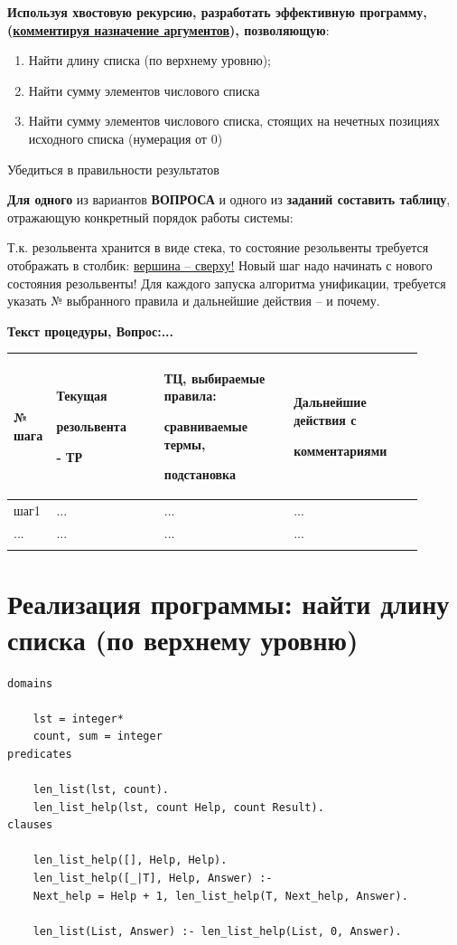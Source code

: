 \documentclass[a4paper,12pt]{article}
\begin{document}
{\bf Используя хвостовую рекурсию, разработать эффективную программу, (\underline{комментируя назначение аргументов}), позволяющую}:
\begin{enumerate}
	\item Найти длину списка (по верхнему уровню);
	\item Найти сумму элементов числового списка 
	\item Найти сумму элементов числового списка, стоящих на нечетных позициях исходного списка (нумерация от 0) 
\end{enumerate}

Убедиться в правильности результатов

{\bf Для одного} из вариантов {\bf ВОПРОСА} и одного из {\bf заданий составить таблицу}, отражающую конкретный порядок работы системы:

Т.к. резольвента хранится в виде стека, то состояние резольвенты требуется отображать в столбик: \underline{вершина – сверху!} Новый шаг надо начинать с нового состояния резольвенты! Для каждого запуска алгоритма унификации, требуется указать № выбранного правила и дальнейшие действия – и почему.


{\bf Текст процедуры,      Вопрос:...}

\begin{center}
	\begin{longtable}[h!]{|p{0.05\linewidth}|p{0.25\linewidth}|p{ 0.3\linewidth}|p{ 0.3\linewidth}|}
		\hline
		{№ шага} & {Текущая
		
	резольвента

- ТР} & {ТЦ, выбираемые правила:

сравниваемые термы,

подстановка} & {Дальнейшие действия с 
			
комментариями}\\
		\hline
		{шаг1} & {...} & {...} & {...}\\
		\hline
		{...} & {...} & {...} & {...}\\
		\hline
		\label{m1}
	\end{longtable}
\end{center}

\newpage

\section*{Реализация программы: найти длину списка (по верхнему уровню)}

\begin{verbatim}
domains

	lst = integer*
	count, sum = integer
predicates

	len_list(lst, count).
	len_list_help(lst, count Help, count Result).
clauses

	len_list_help([], Help, Help).
	len_list_help([_|T], Help, Answer) :- 
	Next_help = Help + 1, len_list_help(T, Next_help, Answer).
	
	len_list(List, Answer) :- len_list_help(List, 0, Answer).
\end{verbatim}
\end{document}
